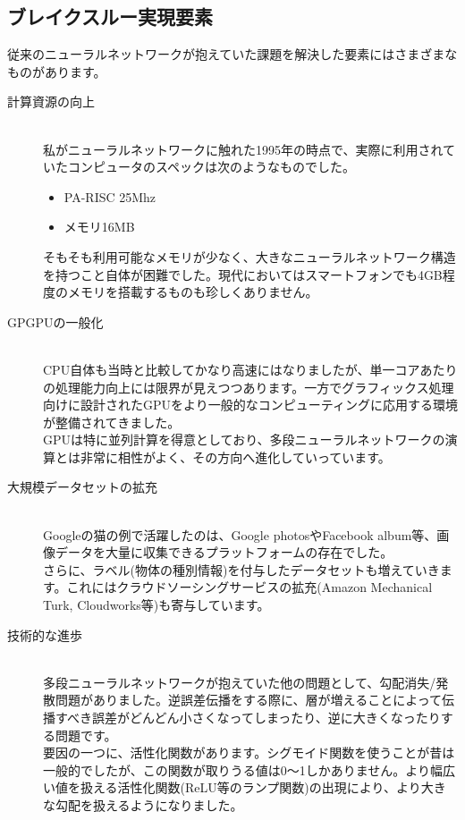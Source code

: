 \documentclass[mingoth,a4paper]{jsarticle}
\begin{document}
\subsection{ブレイクスルー実現要素}

従来のニューラルネットワークが抱えていた課題を解決した要素にはさまざまなものがあります。

\begin{description}
\item[計算資源の向上] \mbox{} \\
  私がニューラルネットワークに触れた1995年の時点で、実際に利用されていたコンピュータのスペックは次のようなものでした。
  \begin{itemize}
  \item PA-RISC 25Mhz
  \item メモリ16MB
  \end{itemize}
  そもそも利用可能なメモリが少なく、大きなニューラルネットワーク構造を持つこと自体が困難でした。現代においてはスマートフォンでも4GB程度のメモリを搭載するものも珍しくありません。
\item[GPGPUの一般化] \mbox{} \\
  CPU自体も当時と比較してかなり高速にはなりましたが、単一コアあたりの処理能力向上には限界が見えつつあります。一方でグラフィックス処理向けに設計されたGPUをより一般的なコンピューティングに応用する環境が整備されてきました。\\
  GPUは特に並列計算を得意としており、多段ニューラルネットワークの演算とは非常に相性がよく、その方向へ進化していっています。
\item[大規模データセットの拡充]  \mbox{} \\
  Googleの猫の例で活躍したのは、Google photosやFacebook album等、画像データを大量に収集できるプラットフォームの存在でした。\\
  さらに、ラベル(物体の種別情報)を付与したデータセットも増えていきます。これにはクラウドソーシングサービスの拡充(Amazon Mechanical Turk, Cloudworks等)も寄与しています。
\item[技術的な進歩]  \mbox{} \\
  多段ニューラルネットワークが抱えていた他の問題として、勾配消失/発散問題がありました。逆誤差伝播をする際に、層が増えることによって伝播すべき誤差がどんどん小さくなってしまったり、逆に大きくなったりする問題です。\\
  要因の一つに、活性化関数があります。シグモイド関数を使うことが昔は一般的でしたが、この関数が取りうる値は0〜1しかありません。より幅広い値を扱える活性化関数(ReLU等のランプ関数)の出現により、より大きな勾配を扱えるようになりました。\\

\end{description}
\end{document}
